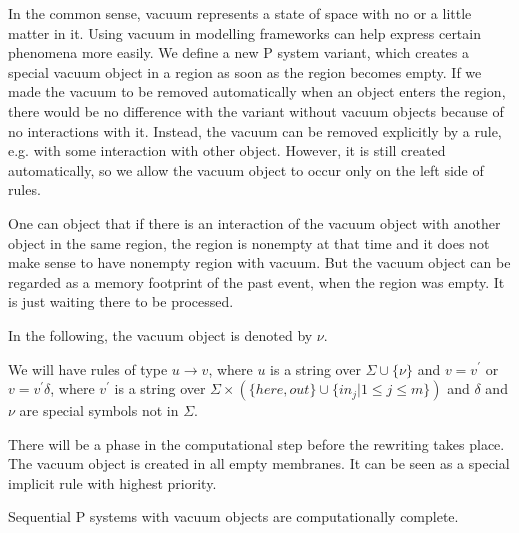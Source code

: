 In the common sense, vacuum represents a state of space with no or a little matter in it. Using vacuum in modelling frameworks can help express certain phenomena more easily. We define a new P system variant, which creates a special vacuum object in a region as soon as the region becomes empty.
If we made the vacuum to be removed automatically when an object enters the region, there would be no difference with the variant without vacuum objects because of no interactions with it. Instead, the vacuum can be removed explicitly by a rule, e.g. with some interaction with other object. However, it is still created automatically, so we allow the vacuum object to occur only on the left side of rules.

One can object that if there is an interaction of the vacuum object with another object in the same region, the region is nonempty at that time and it does not make sense to have nonempty region with vacuum. But the vacuum object can be regarded as a memory footprint of the past event, when the region was empty. It is just waiting there to be processed.

In the following, the vacuum object is denoted by $\nu$.

We will have rules of type $u\rightarrow v$, where $u$ is a string over $\Sigma\cup\{\nu\}$ and $v=v^\prime$ or $v=v^\prime\delta$, where $v^\prime$ is a string over $\Sigma\times(\{here, out\}\cup\{in_j|1\leq j\leq m\})$ and $\delta$ and $\nu$ are special symbols not in $\Sigma$.

There will be a phase in the computational step before the rewriting takes place. The vacuum object is created in all empty membranes. It can be seen as a special implicit rule with highest priority.

\begin{veta}
   Sequential P systems with vacuum objects are computationally complete.
\end{veta}

